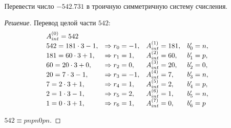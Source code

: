 \begin{exampl}[Задача]
    Перевести число $-542.731$ в троичную симметричную систему счисления.
\end{exampl}

\begin{proof}[Решение]
    Перевод целой части $542$:
    \[
    \begin{array}[c]{llll}
    A_{int}^{(0)}=542\\
    542=181\cdot 3 - 1, &\Rightarrow r_{0}=-1,  &A_{int}^{(1)}=181, &b_{0}'=n,\\
    181=60\cdot 3 + 1,  &\Rightarrow r_{1}=1,   &A_{int}^{(2)}=60,  &b_{1}'=p,\\
    60=20\cdot 3 + 0,   &\Rightarrow r_{2}=0,   &A_{int}^{(3)}=20,  &b_{2}'=0,\\
    20=7\cdot 3 - 1,    &\Rightarrow r_{3}=-1,  &A_{int}^{(4)}=7,   &b_{3}'=n,\\
    7=2\cdot 3 + 1,     &\Rightarrow r_{4}=1,   &A_{int}^{(5)}=2,   &b_{4}'=p,\\
    2=1\cdot 3 - 1,     &\Rightarrow r_{5}=2,   &A_{int}^{(6)}=1,   &b_{5}'=n,\\
    1=0\cdot 3 + 1,     &\Rightarrow r_{6}=1,   &A_{int}^{(7)}=0,   &b_{6}'=p
    \end{array}
    \]

    $542 \equiv pnpn0pn$.


\end{proof}
